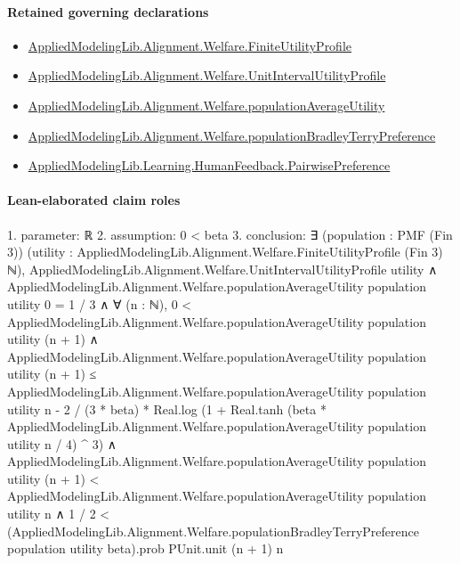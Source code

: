 \documentclass[10pt]{article}
\begin{document}
\paragraph{Retained governing declarations}
\begin{itemize}\raggedright
\item \hyperlink{library-prerequisite-56c0734f8877ddbe}{Applied\allowbreak{}Modeling\allowbreak{}Lib.\allowbreak{}Alignment.\allowbreak{}Welfare.\allowbreak{}Finite\allowbreak{}Utility\allowbreak{}Profile}
\item \hyperlink{library-prerequisite-cbe8afa0d6d1ba78}{Applied\allowbreak{}Modeling\allowbreak{}Lib.\allowbreak{}Alignment.\allowbreak{}Welfare.\allowbreak{}Unit\allowbreak{}Interval\allowbreak{}Utility\allowbreak{}Profile}
\item \hyperlink{library-prerequisite-15f4b442749deab2}{Applied\allowbreak{}Modeling\allowbreak{}Lib.\allowbreak{}Alignment.\allowbreak{}Welfare.\allowbreak{}population\allowbreak{}Average\allowbreak{}Utility}
\item \hyperlink{library-prerequisite-cf06d15d7f8b7c31}{Applied\allowbreak{}Modeling\allowbreak{}Lib.\allowbreak{}Alignment.\allowbreak{}Welfare.\allowbreak{}population\allowbreak{}Bradley\allowbreak{}Terry\allowbreak{}Preference}
\item \hyperlink{library-prerequisite-7e2db20cf087d9ba}{Applied\allowbreak{}Modeling\allowbreak{}Lib.\allowbreak{}Learning.\allowbreak{}Human\allowbreak{}Feedback.\allowbreak{}Pairwise\allowbreak{}Preference}
\end{itemize}
\paragraph{Lean-elaborated claim roles}\begin{ReviewVerbatim}
1. parameter: ℝ
2. assumption: 0 < beta
3. conclusion: ∃ (population : PMF (Fin 3)) (utility : AppliedModelingLib.Alignment.Welfare.FiniteUtilityProfile (Fin 3) ℕ),
  AppliedModelingLib.Alignment.Welfare.UnitIntervalUtilityProfile utility ∧
    AppliedModelingLib.Alignment.Welfare.populationAverageUtility population utility 0 = 1 / 3 ∧
      ∀ (n : ℕ),
        0 < AppliedModelingLib.Alignment.Welfare.populationAverageUtility population utility (n + 1) ∧
          AppliedModelingLib.Alignment.Welfare.populationAverageUtility population utility (n + 1) ≤
              AppliedModelingLib.Alignment.Welfare.populationAverageUtility population utility n -
                2 / (3 * beta) *
                  Real.log
                    (1 +
                      Real.tanh
                          (beta * AppliedModelingLib.Alignment.Welfare.populationAverageUtility population utility n /
                            4) ^
                        3) ∧
            AppliedModelingLib.Alignment.Welfare.populationAverageUtility population utility (n + 1) <
                AppliedModelingLib.Alignment.Welfare.populationAverageUtility population utility n ∧
              1 / 2 <
                (AppliedModelingLib.Alignment.Welfare.populationBradleyTerryPreference population utility beta).prob
                  PUnit.unit (n + 1) n
\end{ReviewVerbatim}
\end{document}
